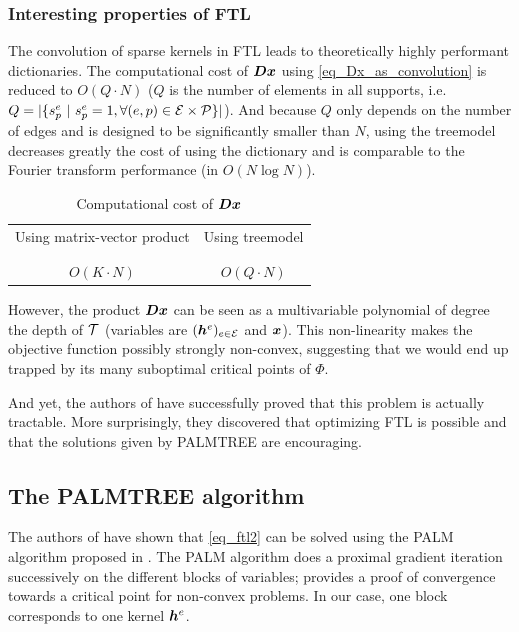 \subsubsection{Interesting properties of \ac{FTL}}

The convolution of sparse kernels in \ac{FTL} leads to theoretically highly performant dictionaries. The computational cost of $\bm{D}\bm{x}$ using \cref{eq_Dx_as_convolution} is reduced to $O(Q \cdot N)$ ($Q$ is the number of elements in all supports, i.e. $Q=|\{s^e_p ~|~ s^e_p = 1, \forall (e,p) \in \mathcal E \times \mathcal P\}|$). And because $Q$ only depends on the number of edges and is designed to be significantly smaller than  $N$, using the \gls{treemodel} decreases greatly the cost of using the dictionary and is comparable to the Fourier transform performance (in $O(N \log N)$).

\begin{table}[!ht] \centering 
\caption{Computational cost of $\bm{D}\bm{x}$} \label{table_comparison_Dx_costs}
\begin{tabular}{c|c}
Using matrix-vector product & Using \gls{treemodel} \\\\ \hline \\
$O(K \cdot N)$ & $O(Q \cdot N)$
\end{tabular}
\end{table}


However, the product $\bm{D}\bm{x}$ can be seen as a multivariable polynomial of degree the depth of $\mathcal T$ (variables are $(\bm{h}^e)_{e \in \mathcal E}$ and $\bm{x}$). This non-linearity makes the objective function possibly strongly non-convex, suggesting that we would end up trapped by its many suboptimal critical points of $\Phi$.

And yet, the authors of \cite{chabiron_optimization_2016} have successfully proved that this problem is actually tractable. More surprisingly, they discovered that optimizing \ac{FTL} is possible and that the solutions given by \acs{PALMTREE} are encouraging.


\subsection{The PALMTREE algorithm}\label{sec_palmtree}

The authors of \cite{chabiron_optimization_2016} have shown that \eqref{eq_ftl2} can be solved using the \ac{PALM} algorithm proposed in \cite{bolte_proximal_2014}. The \ac{PALM} algorithm does a proximal gradient iteration successively on the different blocks of variables; \cite{bolte_proximal_2014} provides a proof of convergence towards a critical point for non-convex problems. In our case, one block corresponds to one kernel $\bm{h}^e$.


